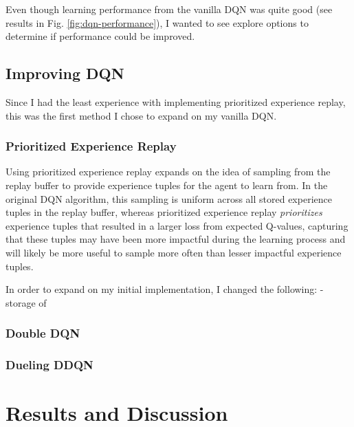 \documentclass[11pt]{article}
\begin{document}
\FloatBarrier

Even though learning performance from the vanilla DQN was quite good (see results in
Fig. \ref{fig:dqn-performance}), I wanted to see explore options to determine if
performance could be improved.

\subsection{Improving DQN}

Since I had the least experience with implementing prioritized experience
replay, this was the first method I chose to expand on my vanilla DQN.

\subsubsection{Prioritized Experience Replay}

Using prioritized experience replay expands on the idea of sampling from the
replay buffer to provide experience tuples for the agent to learn from. In the
original DQN algorithm, this sampling is uniform across all stored experience
tuples in the replay buffer, whereas prioritized experience replay
\textit{prioritizes} experience tuples that resulted in a larger loss from
expected Q-values, capturing that these tuples may have been more impactful
during the learning process and will likely be more useful to sample more often
than lesser impactful experience tuples.

In order to expand on my initial implementation, I changed the following:
- storage of 


\subsubsection{Double DQN}


\subsubsection{Dueling DDQN}

\FloatBarrier

\begin{figure}[!ht]
    \centering
    \caption{}
    \label{fig:dueling-architecture}
\end{figure}

\FloatBarrier

\section{Results and Discussion}
\end{document}
